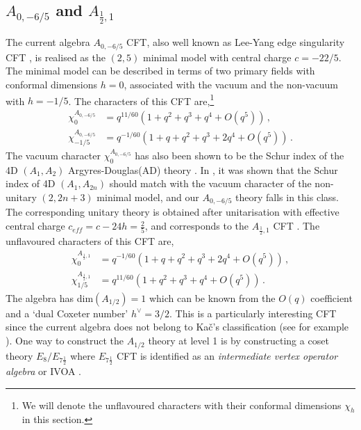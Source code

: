 \documentclass[a4paper,12pt]{article}
\begin{document}

\subsection{\ensuremath{A_{0,-6/5}} and \ensuremath{A_{\frac{1}{2},1}}}
The current algebra $A_{0,-6/5}$ CFT, also well known as Lee-Yang edge singularity CFT \cite{Kawasetsu_2013}, is realised as the $(2,5)$ minimal model with central charge $c=-22/5$.  The minimal model can be described in terms of two primary fields with conformal dimensions $h=0$, associated with the vacuum and the non-vacuum with $h=-1/5$. The characters of this CFT are,\footnote{We will denote the unflavoured characters with their conformal dimensions $\chi_h$ in this section.}
%
\begin{align}\label{a0-chars}
    \chi_0^{A_{0,-6/5}}&=q^{11/60}(1+q^2+q^3+q^4+\textit{O}(q^5))\, ,\nonumber\\
    \chi_{-1/5}^{A_{0,-6/5}}&=q^{-1/60}(1+q+q^2+q^3+2q^4+\textit{O}(q^5))\, .
\end{align}
%
The vacuum character $\chi_0^{A_{0,-6/5}}$ has also been shown to be the Schur index of the 4D $(A_1,A_2)$ Argyres-Douglas(AD) theory \cite{Cecotti:2010fi}. In \cite{Cecotti:2010fi}, it was shown that the Schur index of 4D $(A_1,A_{2n})$ should match with the vacuum character of the non-unitary $(2,2n+3)$ minimal model, and our $A_{0,-6/5}$ theory falls in this class. The corresponding unitary theory is obtained after unitarisation with effective central charge $c_{eff}=c-24h=\frac{2}{5}$, and corresponds to the $A_{\frac{1}{2},1}$ CFT \cite{Mathur:1988gt,Mathur:1988na,Mathur:1988rx,Chandra:2018pjq}. The unflavoured characters of this CFT are,
\begin{align}\label{a0-chars-exchanged}
    \chi_{0}^{A_{\frac{1}{2},1}}&=q^{-1/60}(1+q+q^2+q^3+2q^4+\textit{O}(q^5))\, ,\nonumber\\
    \chi_{1/5}^{A_{\frac{1}{2},1}}&=q^{11/60}(1+q^2+q^3+q^4+\textit{O}(q^5))\, .
\end{align}
%
The algebra has dim$(A_{1/2})=1$ which can be known from the $\textit{O}(q)$ coefficient and a `dual Coxeter number' $h^\vee=3/2$\cite{2cf0314cf8fd4509a1f3b973a384ae12}. This is a particularly interesting CFT since the current algebra does not belong to Ka\v c's classification (see for example \cite{kac_1990}).  One way to construct the $A_{1/2}$ theory at level 1 is by constructing a coset theory $E_8/E_{7\frac{1}{2}}$ where $E_{7\frac{1}{2}}$ CFT is identified as an \textit{intermediate vertex operator algebra} or IVOA \cite{Kawasetsu_2013, Marrani:2015nta, Lee:2023owa}.
\end{document}
